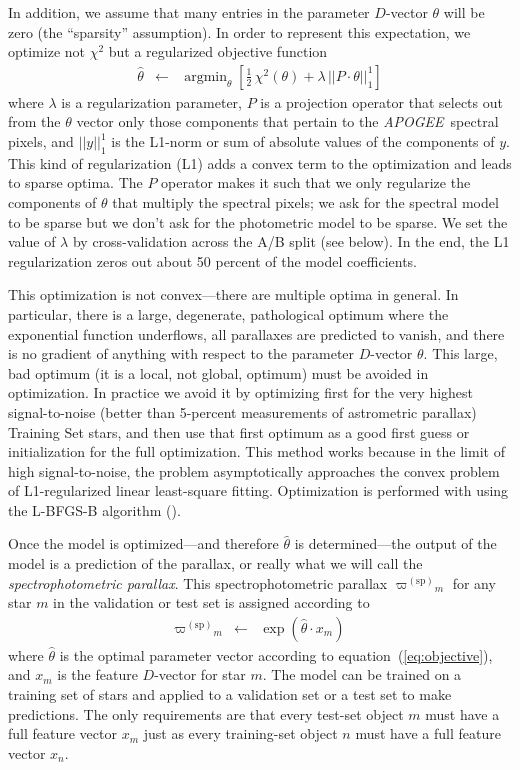\documentclass[modern]{aastex62}
\newcommand{\equationname}{equation}
\newcommand{\code}[1]{\texttt{\detokenize{#1}}}
\newcommand{\acronym}[1]{{\small{#1}}}
\newcommand{\project}[1]{\textsl{#1}}
\newcommand{\apogee}{\project{\acronym{APOGEE}}}
\DeclareMathOperator*{\argmin}{argmin}
\newcommand{\sparallax}{{\varpi^{(\mathrm{sp})}}}
\begin{document}
In addition, we assume that many entries in the parameter $D$-vector $\theta$ will be zero
(the ``sparsity'' assumption).
In order to represent this expectation,
we optimize not $\chi^2$ but a regularized objective function
\begin{eqnarray}
\hat{\theta} &\leftarrow& \argmin_{\theta}\left[\frac{1}{2}\,\chi^2(\theta) + \lambda\,||P\cdot\theta||_1^1\right]
\label{eq:objective}
\end{eqnarray}
where
$\lambda$ is a regularization parameter,
$P$ is a projection operator that selects out from the $\theta$ vector only those components
that pertain to the \apogee\ spectral pixels,
and $||y||_1^1$ is the L1-norm or sum of absolute values of the components of $y$.
This kind of regularization (L1) adds a convex term to the optimization and leads to
sparse optima.
The $P$ operator makes it such that we only regularize the components of $\theta$ that multiply
the spectral pixels; we ask for the spectral model to be sparse but we don't ask for the photometric
model to be sparse.
We set the value of $\lambda$ by cross-validation across the A/B split (see below).
In the end, the L1 regularization zeros out about 50 percent of the model coefficients.

This optimization is not convex---there are multiple optima in general.
In particular, there is a large, degenerate, pathological optimum where
the exponential function underflows, all parallaxes are predicted to vanish,
and there is no gradient of anything with respect to the parameter $D$-vector $\theta$.
This large, bad optimum (it is a local, not global, optimum) must be avoided in optimization.
In practice we avoid it by optimizing first for the very highest signal-to-noise
(better than 5-percent measurements of astrometric parallax)
Training Set stars, and then use that first optimum as a
good first guess or initialization for the full optimization.
This method works because in the limit of high signal-to-noise, the problem asymptotically approaches
the convex problem of L1-regularized linear least-square fitting.
Optimization is performed with \code{scipy.optimize} using the
\acronym{L-BFGS-B} algorithm (\citealt{lbfgsb}).

Once the model is optimized---and therefore $\hat{\theta}$ is determined---the
output of the model is a prediction of the parallax,
or really what we will call the \emph{spectrophotometric parallax}.
This spectrophotometric parallax
$\sparallax_m$ for any star $m$ in the validation or test set is
assigned according to
\begin{eqnarray}
\sparallax_m &\leftarrow& \exp(\hat{\theta}\cdot x_m)
\end{eqnarray}
where
$\hat{\theta}$ is the optimal parameter vector according
to \equationname~(\ref{eq:objective}),
and
$x_m$ is the feature $D$-vector for star $m$.
The model can be trained on a training set of stars and applied to
a validation set or a test set to make predictions.
The only requirements are that every test-set object $m$  must have a full feature
vector $x_m$ just as every training-set object $n$ must have a full feature
vector $x_n$.
\end{document}
